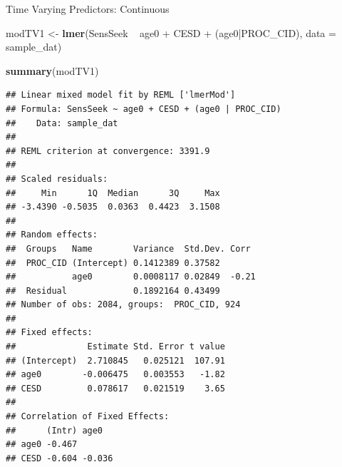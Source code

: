 \documentclass[ignorenonframetext,]{beamer}
\newenvironment{Shaded}{\begin{snugshade}}{\end{snugshade}}
\newcommand{\KeywordTok}[1]{\textcolor[rgb]{0.13,0.29,0.53}{\textbf{{#1}}}}
\newcommand{\DataTypeTok}[1]{\textcolor[rgb]{0.13,0.29,0.53}{{#1}}}
\newcommand{\StringTok}[1]{\textcolor[rgb]{0.31,0.60,0.02}{{#1}}}
\newcommand{\NormalTok}[1]{{#1}}
\begin{document}
\begin{frame}[fragile]{Time Varying Predictors: Continuous}

\small

\begin{Shaded}
\begin{Highlighting}[]
\NormalTok{modTV1 <-}\StringTok{ }\KeywordTok{lmer}\NormalTok{(SensSeek ~}\StringTok{ }\NormalTok{age0 +}\StringTok{ }\NormalTok{CESD +}\StringTok{ }\NormalTok{(age0|PROC_CID), }\DataTypeTok{data =} \NormalTok{sample_dat)}
\end{Highlighting}
\end{Shaded}

\end{frame}

\begin{frame}[fragile]

\tiny

\begin{Shaded}
\begin{Highlighting}[]
\KeywordTok{summary}\NormalTok{(modTV1)}
\end{Highlighting}
\end{Shaded}

\begin{verbatim}
## Linear mixed model fit by REML ['lmerMod']
## Formula: SensSeek ~ age0 + CESD + (age0 | PROC_CID)
##    Data: sample_dat
## 
## REML criterion at convergence: 3391.9
## 
## Scaled residuals: 
##     Min      1Q  Median      3Q     Max 
## -3.4390 -0.5035  0.0363  0.4423  3.1508 
## 
## Random effects:
##  Groups   Name        Variance  Std.Dev. Corr 
##  PROC_CID (Intercept) 0.1412389 0.37582       
##           age0        0.0008117 0.02849  -0.21
##  Residual             0.1892164 0.43499       
## Number of obs: 2084, groups:  PROC_CID, 924
## 
## Fixed effects:
##              Estimate Std. Error t value
## (Intercept)  2.710845   0.025121  107.91
## age0        -0.006475   0.003553   -1.82
## CESD         0.078617   0.021519    3.65
## 
## Correlation of Fixed Effects:
##      (Intr) age0  
## age0 -0.467       
## CESD -0.604 -0.036
\end{verbatim}

\normalsize

\end{frame}
\end{document}
